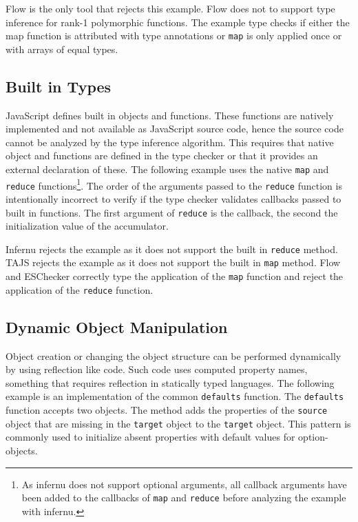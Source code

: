 
Flow is the only tool that rejects this example. Flow does not to support type inference for rank-1 polymorphic functions. The example type checks if either the map function is attributed with type annotations or \texttt{map} is only applied once or with arrays of equal types. 

\subsection{Built in Types}
JavaScript defines built in objects and functions. These functions are natively implemented and not available as JavaScript source code, hence the source code cannot be analyzed by the type inference algorithm. This requires that native object and functions are defined in the type checker or that it provides an external declaration of these. The following example uses the native \texttt{map} and \texttt{reduce} functions\footnote{As infernu does not support optional arguments, all callback arguments have been added to the callbacks of \texttt{map} and \texttt{reduce} before analyzing the example with infernu.}. The order of the arguments passed to the \texttt{reduce} function is intentionally incorrect to verify if the type checker validates callbacks passed to built in functions. The first argument of \texttt{reduce} is the callback, the second the initialization value of the accumulator. 


Infernu rejects the example as it does not support the built in \texttt{reduce} method. TAJS rejects the example as it does not support the built in \texttt{map} method. Flow and ESChecker correctly type the application of the \texttt{map} function and reject the application of the \texttt{reduce} function.

\subsection{Dynamic Object Manipulation}
Object creation or changing the object structure can be performed dynamically by using reflection like code. Such code uses computed property names, something that requires reflection in statically typed languages. The following example is an implementation of the common \texttt{defaults} function. The \texttt{defaults} function accepts two objects. The method adds the properties of the \texttt{source} object that are missing in the \texttt{target} object to the \texttt{target} object. This pattern is commonly used to initialize absent properties with default values for option-objects.

